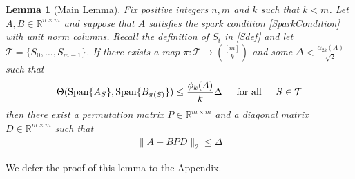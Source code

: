 \documentclass[journal, onecolumn]{IEEEtran}
\newtheorem{lemma}{Lemma}
\begin{document}
\begin{lemma}[Main Lemma]\label{MainLemma}
Fix positive integers $n, m$ and $k$ such that $k < m$. Let $A, B \in \mathbb{R}^{n \times m}$ and suppose that $A$ satisfies the spark condition \eqref{SparkCondition} with unit norm columns. Recall the definition of $S_i$ in \eqref{Sdef} and let $\mathcal{T} = \{S_0, \ldots, S_{m-1}\}$. If there exists a map $\pi: \mathcal{T} \to {[m] \choose k}$ and some $\Delta < \frac{\alpha_{2k}(A)}{\sqrt{2}}$ such that 
\begin{equation}\label{GapUpperBound}
\Theta(\text{Span}\{A_{S}\}, \text{Span}\{B_{\pi(S)}\}) \leq \frac{ \phi_k(A) }{k} \Delta \indent \text{for all} \indent S \in \mathcal{T}
\end{equation}
%
then there exist a permutation matrix $P \in \mathbb{R}^{m \times m}$ and a diagonal matrix $D \in \mathbb{R}^{m \times m}$ such that
\begin{align}
\|A - BPD\|_2 \leq \Delta
\end{align}
\end{lemma}

We defer the proof of this lemma to the Appendix. 

\end{document}

